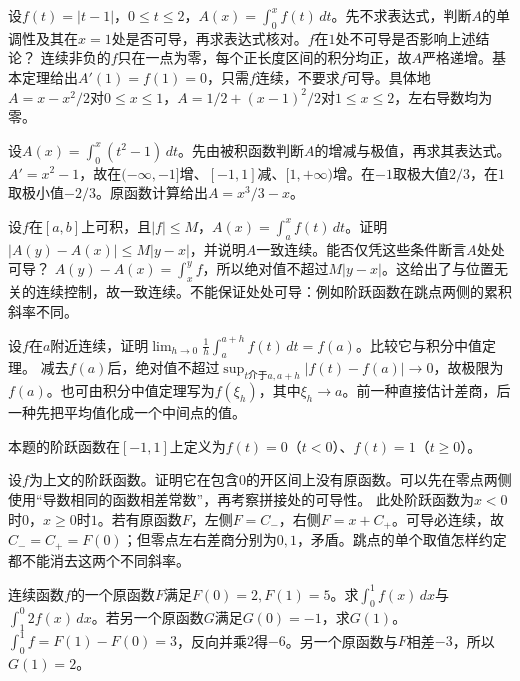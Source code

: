 \setlength{\parskip}{3.5pt}
设\(f(t)=|t-1|\)，\(0\le t\le2\)，\(A(x)=\int_0^xf(t)\,dt\)。先不求表达式，判断\(A\)的单调性及其在\(x=1\)处是否可导，再求表达式核对。\(f\)在\(1\)处不可导是否影响上述结论？
\solutionanswer
连续非负的\(f\)只在一点为零，每个正长度区间的积分均正，故\(A\)严格递增。基本定理给出\(A'(1)=f(1)=0\)，只需\(f\)连续，不要求\(f\)可导。具体地\(A=x-x^2/2\)对\(0\le x\le1\)，\(A=1/2+(x-1)^2/2\)对\(1\le x\le2\)，左右导数均为零。


\setlength{\parskip}{3.5pt}
设\(A(x)=\int_0^x(t^2-1)\,dt\)。先由被积函数判断\(A\)的增减与极值，再求其表达式。
\solutionanswer
\(A'=x^2-1\)，故在\(( -\infty,-1]\)增、\([-1,1]\)减、\([1,+\infty)\)增。在\(-1\)取极大值\(2/3\)，在\(1\)取极小值\(-2/3\)。原函数计算给出\(A=x^3/3-x\)。


\setlength{\parskip}{3.5pt}
设\(f\)在\([a,b]\)上可积，且\(|f|\le M\)，\(A(x)=\int_a^xf(t)\,dt\)。证明\(|A(y)-A(x)|\le M|y-x|\)，并说明\(A\)一致连续。能否仅凭这些条件断言\(A\)处处可导？
\solutionanswer
\(A(y)-A(x)=\int_x^y f\)，所以绝对值不超过\(M|y-x|\)。这给出了与位置无关的连续控制，故一致连续。不能保证处处可导：例如阶跃函数在跳点两侧的累积斜率不同。


\setlength{\parskip}{3.5pt}
设\(f\)在\(a\)附近连续，证明\(\displaystyle\lim_{h\to0}\frac1h\int_a^{a+h}f(t)\,dt=f(a)\)。比较它与积分中值定理。
\solutionanswer
减去\(f(a)\)后，绝对值不超过\(\sup_{t\text{介于}a,a+h}|f(t)-f(a)|\to0\)，故极限为\(f(a)\)。也可由积分中值定理写为\(f(\xi_h)\)，其中\(\xi_h\to a\)。前一种直接估计差商，后一种先把平均值化成一个中间点的值。


本题的阶跃函数在\([-1,1]\)上定义为\(f(t)=0\)（\(t<0\)）、\(f(t)=1\)（\(t\ge0\)）。

\setlength{\parskip}{3.5pt}
设\(f\)为上文的阶跃函数。证明它在包含\(0\)的开区间上没有原函数。可以先在零点两侧使用“导数相同的函数相差常数”，再考察拼接处的可导性。
\solutionanswer
此处阶跃函数为\(x<0\)时\(0\)，\(x\ge0\)时\(1\)。若有原函数\(F\)，左侧\(F=C_-\)，右侧\(F=x+C_+\)。可导必连续，故\(C_-=C_+=F(0)\)；但零点左右差商分别为\(0,1\)，矛盾。跳点的单个取值怎样约定都不能消去这两个不同斜率。


\setlength{\parskip}{3.5pt}
连续函数\(f\)的一个原函数\(F\)满足\(F(0)=2,F(1)=5\)。求\(\int_0^1f(x)\,dx\)与\(\int_1^0 2f(x)\,dx\)。若另一个原函数\(G\)满足\(G(0)=-1\)，求\(G(1)\)。
\solutionanswer
\(\int_0^1f=F(1)-F(0)=3\)，反向并乘\(2\)得\(-6\)。另一个原函数与\(F\)相差\(-3\)，所以\(G(1)=2\)。


